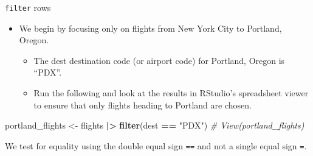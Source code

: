 \documentclass[
  ignorenonframetext,
]{beamer}
\newenvironment{Shaded}{\begin{snugshade}}{\end{snugshade}}
\newcommand{\CommentTok}[1]{\textcolor[rgb]{0.56,0.35,0.01}{\textit{#1}}}
\newcommand{\FunctionTok}[1]{\textcolor[rgb]{0.13,0.29,0.53}{\textbf{#1}}}
\newcommand{\NormalTok}[1]{#1}
\newcommand{\OtherTok}[1]{\textcolor[rgb]{0.56,0.35,0.01}{#1}}
\newcommand{\SpecialCharTok}[1]{\textcolor[rgb]{0.81,0.36,0.00}{\textbf{#1}}}
\newcommand{\StringTok}[1]{\textcolor[rgb]{0.31,0.60,0.02}{#1}}
\providecommand{\tightlist}{%
  \setlength{\itemsep}{0pt}\setlength{\parskip}{0pt}}
\begin{document}
\begin{frame}[fragile]{\texttt{filter} rows}
\protect\hypertarget{filter-rows-1}{}
\begin{itemize}
\item
  We begin by focusing only on flights from New York City to Portland,
  Oregon.

  \begin{itemize}
  \tightlist
  \item
    The dest destination code (or airport code) for Portland, Oregon is
    ``PDX''.
  \item
    Run the following and look at the results in RStudio's spreadsheet
    viewer to ensure that only flights heading to Portland are chosen.
  \end{itemize}
\end{itemize}

\normalsize

\begin{Shaded}
\begin{Highlighting}[]
\NormalTok{portland\_flights }\OtherTok{\textless{}{-}}\NormalTok{ flights }\SpecialCharTok{|\textgreater{}} 
  \FunctionTok{filter}\NormalTok{(dest }\SpecialCharTok{==} \StringTok{"PDX"}\NormalTok{)}
\CommentTok{\# View(portland\_flights)}
\end{Highlighting}
\end{Shaded}

\normalsize

We test for equality using the double equal sign \texttt{==} and not a
single equal sign \texttt{=}.
\end{frame}
\end{document}
